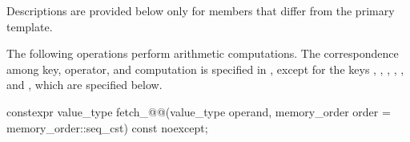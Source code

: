 \pnum
Descriptions are provided below only for members
that differ from the primary template.

\pnum
The following operations perform arithmetic computations.
The correspondence among key, operator, and computation is specified
in ,
except for the keys
,
,
,
,
, and
,
which are specified below.

%
%
%
%
%
%
%
%
\begin{itemdecl}
constexpr value_type fetch_@@(value_type operand,
                               memory_order order = memory_order::seq_cst) const noexcept;
\end{itemdecl}

